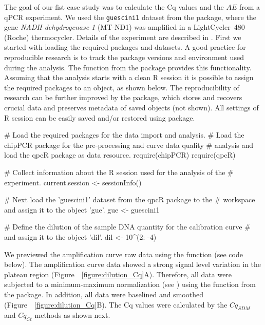 The goal of our fist case study was to calculate the Cq values and the $AE$ from 
a qPCR experiment. We used the \texttt{guescini1} dataset from the  
package, where the gene \textit{NADH dehydrogenase 1} (MT-ND1) was amplified in 
a LightCycler\circledR~480 (Roche) thermocycler. Details of the experiment are 
described in \citet{guescini_2008}. First we started with loading the required 
packages and datasets. A good practice for reproducible research is to track the 
package versions and environment used during the analysis. The function 
 from the  package provides this functionality. 
Assuming that the analysis starts with a clean R session it is possible to 
assign the required packages to an object, as shown below. The reproducibility 
of research can be further improved by the  package, which 
stores and recovers crucial data and preserves metadata of saved objects (not 
shown). All settings of R session can be easily saved and/or restored using 
 package.

\begin{example}
# Load the required packages for the data import and analysis.
# Load the chipPCR package for the pre-processing and curve data quality
# analysis and load the qpcR package as data resource.
require(chipPCR)
require(qpcR)

# Collect information about the R session used for the analysis of the
# experiment.
current.session <- sessionInfo()

# Next load the 'guescini1' dataset from the qpcR package to the
# workspace and assign it to the object 'gue'.
gue <- guescini1

# Define the dilution of the sample DNA quantity for the calibration curve 
# and assign it to the object 'dil'.
dil <- 10^(2: -4)
\end{example}

We previewed the amplification curve raw data using the  
function (see code below). The amplification curve data showed a strong signal 
level variation in the plateau region (Figure~~\ref{figure:dilution_Cq}A). 
Therefore, all data were subjected to a minimum-maximum normalization (see 
\citet{roediger_RJ_2013}) using the  function from the 
 package. In addition, all data were baselined and smoothed 
(Figure~~\ref{figure:dilution_Cq}B). The Cq values were calculated by the 
$Cq_{SDM}$ and $Cq_{Ct}$ methods as shown next.

